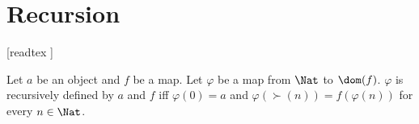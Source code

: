 \documentclass[../arithmetic.tex]{subfiles}
\begin{document}
  \chapter{Recursion}\label{chapter:recursion}


  \begin{forthel}

    [readtex ]

  \end{forthel}


  \begin{forthel}
    \begin{definition}
      Let $a$ be an object and $f$ be a map.
      Let $\varphi$ be a map from $\Nat$ to $\dom(f)$.
      $\varphi$ is recursively defined by $a$ and $f$ iff $\varphi(0) = a$ and
      $\varphi(\succ(n)) = f(\varphi(n))$ for every $n \in \Nat$.
    \end{definition}
  \end{forthel}
\end{document}
